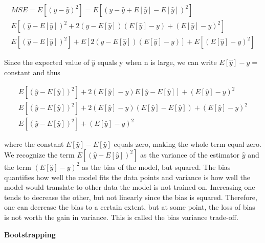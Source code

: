 \documentclass[12pt,a4paper]{article}
\begin{document}
\begin{equation}\label{eq:mseDerive}
\begin{aligned}
MSE = E[(y-\hat{y})^2] = E[(y-\hat{y} + E[\hat{y}] - E[\hat{y}])^2]
\\
E[(\hat{y} - E[\hat{y}])^2 + 2(\hat{y} - E[\hat{y}])(E[\hat{y}]-y) + (E[\hat{y}]-y)^2]
\\
E[(\hat{y} - E[\hat{y}])^2] + E[2(\hat{y} - E[\hat{y}])(E[\hat{y}]-y)] + E[(E[\hat{y}]-y)^2]
\end{aligned}
\end{equation}

\noindent Since the expected value of $\hat{y}$ equals y when n is large, we can write $E[\hat{y}] - y =$ constant and thus

\begin{equation}\label{eq:mseDerive2}
\begin{aligned}
E[(\hat{y} - E[\hat{y}])^2] + 2(E[\hat{y}]-y)E[\hat{y}-E[\hat{y}]] + (E[\hat{y}]-y)^2
\\
E[(\hat{y} - E[\hat{y}])^2] + 2(E[\hat{y}]-y)(E[\hat{y}] - E[\hat{y}])+ (E[\hat{y}]-y)^2
\\
E[(\hat{y} - E[\hat{y}])^2] + (E[\hat{y}]-y)^2
\end{aligned}
\end{equation}

\noindent where the constant $E[\hat{y}] - E[\hat{y}]$ equals zero, making the whole term equal zero. 
\\
We recognize the term $E[(\hat{y} - E[\hat{y}])^2]$ as the variance of the estimator $\hat{y}$ and the term $(E[\hat{y}]-y)^2$ as the bias of the model, but squared. The bias quantifies how well the model fits the data points and variance is how well the model would translate to other data the model is not trained on. Increasing one tends to decrease the other, but not linearly since the bias is squared. Therefore, one can decrease the bias to a certain extent, but at some point, the loss of bias is not worth the gain in variance. This is called the bias variance trade-off. 

\begin{center}
\large{\textbf{Bootstrapping}}
\end{center}
\end{document}
